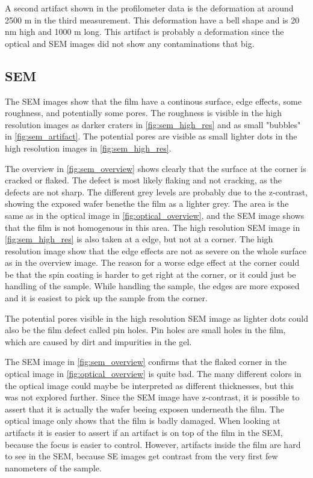 A second artifact shown in the profilometer data is the deformation at around 2500 \textmu m in the third measurement.
This deformation have a bell shape and is 20 nm high and 1000 \textmu m long.
This artifact is probably a deformation since the optical and SEM images did not show any contaminations that big.


\subsection{SEM}

\noindent The SEM images show that the film have a continous surface, edge effects, some roughness, and potentially some pores.
The roughness is visible in the high resolution images as darker craters in \autoref{fig:sem_high_res} and as small "bubbles" in \autoref{fig:sem_artifact}.
The potential pores are visible as small lighter dots in the high resolution images in \autoref{fig:sem_high_res}.

The overview in \autoref{fig:sem_overview} shows clearly that the surface at the corner is cracked or flaked.
The defect is most likely flaking and not cracking, as the defects are not sharp.
The different grey levels are probably due to the z-contrast, showing the exposed wafer benethe the film as a lighter grey.
The area is the same as in the optical image in \autoref{fig:optical_overview}, and the SEM image shows that the film is not homogenous in this area.
The high resolution SEM image in \autoref{fig:sem_high_res} is also taken at a edge, but not at a corner.
The high resolution image show that the edge effects are not as severe on the whole surface as in the overview image.
The reason for a worse edge effect at the corner could be that the spin coating is harder to get right at the corner, or it could just be handling of the sample.
While handling the sample, the edges are more exposed and it is easiest to pick up the sample from the corner.


The potential pores visible in the high resolution SEM image as lighter dots could also be the film defect called pin holes.
Pin holes are small holes in the film, which are caused by dirt and impurities in the gel.

The SEM image in \autoref{fig:sem_overview} confirms that the flaked corner in the optical image in \autoref{fig:optical_overview} is quite bad.
The many different colors in the optical image could maybe be interpreted as different thicknesses, but this was not explored further.
Since the SEM image have z-contrast, it is possible to assert that it is actually the wafer beeing exposen underneath the film.
The optical image only shows that the film is badly damaged.
When looking at artifacts it is easier to assert if an artifact is on top of the film in the SEM, because the focus is easier to control.
However, artifacts inside the film are hard to see in the SEM, because SE images get contrast from the very first few nanometers of the sample.

